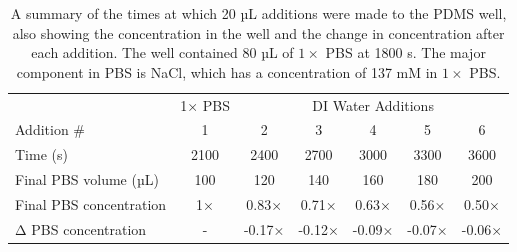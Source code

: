 \documentclass[
  a4paper,
]{scrbook}
\begin{document}
\hypertarget{tbl-salt-conc-series}{}
\begin{longtable}[t]{lcccccc}
\caption{\label{tbl-salt-conc-series}A summary of the times at which 20 µL additions were made to the PDMS
well, also showing the concentration in the well and the change in
concentration after each addition. The well contained 80 µL of
\(1 \times\) PBS at 1800 s. The major component in PBS is NaCl, which
has a concentration of 137 mM in \(1 \times\) PBS. }\tabularnewline

\toprule
\multicolumn{1}{c}{ } & \multicolumn{1}{c}{1× PBS} & \multicolumn{5}{c}{DI Water Additions} \\
\cmidrule(l{3pt}r{3pt}){2-2} \cmidrule(l{3pt}r{3pt}){3-7}
Addition \# & 1 & 2 & 3 & 4 & 5 & 6\\
\midrule
Time (s) & 2100 & 2400 & 2700 & 3000 & 3300 & 3600\\
Final PBS volume (µL) & 100 & 120 & 140 & 160 & 180 & 200\\
Final PBS concentration & 1× & 0.83× & 0.71× & 0.63× & 0.56× & 0.50×\\
Δ PBS concentration & - & -0.17× & -0.12× & -0.09× & -0.07× & -0.06×\\
\bottomrule
\end{longtable}
\end{document}
